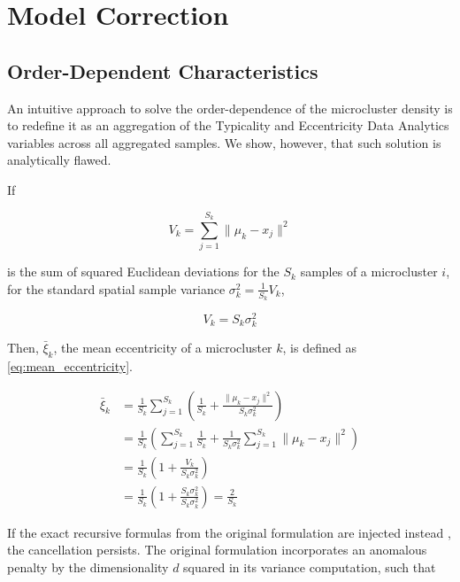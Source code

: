 \chapter{Model Correction}
\label{chap:ModelCorrection}

\section{Order-Dependent Characteristics}
\label{sec:order_dependent_characteristics}

An intuitive approach to solve the order-dependence of the microcluster density is to redefine it as an aggregation of the Typicality and Eccentricity Data Analytics variables across all aggregated samples. We show, however, that such solution is analytically flawed.

If

\begin{equation}
    V_k = \sum_{j=1}^{S_k} \lVert \mu_k - x_j \rVert^2
\end{equation}

is the sum of squared Euclidean deviations for the $S_k$ samples of a microcluster $i$, for the standard spatial sample variance $\sigma^2_k = \frac{1}{S_k} V_k$,

\begin{equation}
    V_k = S_k \sigma^2_k
\end{equation}

Then, $\bar{\xi}_k$, the mean eccentricity of a microcluster $k$, is defined as \cref{eq:mean_eccentricity}.

\begin{align}
    \bar{\xi}_k &= \frac{1}{S_k} \sum_{j=1}^{S_k} \left( \frac{1}{S_k} + \frac{\lVert \mu_k - x_j \rVert^2}{S_k \sigma^2_k} \right) \nonumber \\
                &= \frac{1}{S_k} \left( \sum_{j=1}^{S_k} \frac{1}{S_k} + \frac{1}{S_k \sigma^2_k} \sum_{j=1}^{S_k} \lVert \mu_k - x_j \rVert^2 \right) \nonumber \\
                &= \frac{1}{S_k} \left( 1 + \frac{V_k}{S_k \sigma^2_k} \right) \nonumber \\
                &= \frac{1}{S_k} \left( 1 + \frac{S_k \sigma^2_k}{S_k \sigma^2_k} \right) = \frac{2}{S_k}
    \label{eq:mean_eccentricity}
\end{align}

If the exact recursive formulas from the original \MicroTEDAClus formulation are injected instead \cite{maia2020evolvclus}, the cancellation persists. The original formulation incorporates an anomalous penalty by the dimensionality $d$ squared in its variance computation, such that


